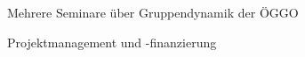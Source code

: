 



	{\begin{cvenumerate}
		\item Mehrere Seminare über Gruppendynamik der ÖGGO
		\item Projektmanagement und -finanzierung
	\end{cvenumerate}}

